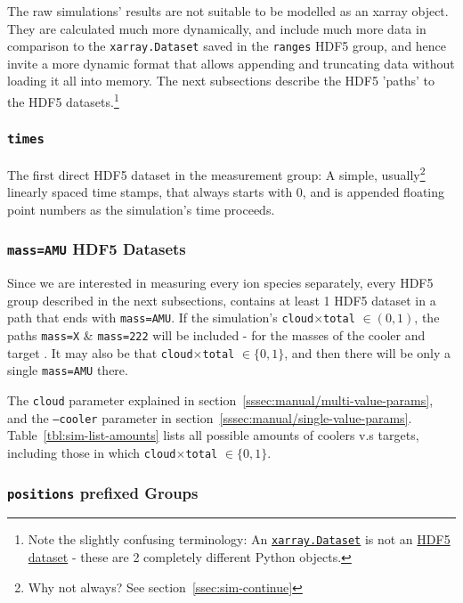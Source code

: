 The raw simulations' results are not suitable to be modelled as an xarray object. They are calculated much more dynamically, and include much more data in comparison to the \texttt{xarray.Dataset} saved in the \texttt{ranges} HDF5 group, and hence invite a more dynamic format that allows appending and truncating data without loading it all into memory. The next subsections describe the HDF5 'paths' to the HDF5 datasets.\footnote{Note the slightly confusing terminology: An \href{https://docs.xarray.dev/en/stable/generated/xarray.Dataset.html}{\texttt{xarray.Dataset}} is not an \href{https://docs.h5py.org/en/stable/high/dataset.html}{HDF5 dataset} - these are 2 completely different Python objects.}

\subsubsection{\texttt{times}}

The first direct HDF5 dataset in the measurement group: A simple, usually\footnote{Why not always? See section~\ref{ssec:sim-continue}} linearly spaced time stamps, that always starts with 0, and is appended floating point numbers as the simulation's time proceeds.

\subsubsection{\texttt{mass=AMU} HDF5 Datasets}

Since we are interested in measuring every ion species separately, every HDF5 group described in the next subsections, contains at least 1 HDF5 dataset in a path that ends with \texttt{mass=AMU}. If the simulation's \texttt{cloud}$\times$\texttt{total} $\in(0,1)$, the paths \texttt{mass=X} \& \texttt{mass=222} will be included - for the masses of the cooler and target . It may also be that \texttt{cloud}$\times$\texttt{total} $\in\{0,1\}$, and then there will be only a single \texttt{mass=AMU} there.

The \texttt{cloud} parameter explained in section~\ref{sssec:manual/multi-value-params}, and the \texttt{--cooler} parameter in section~\ref{sssec:manual/single-value-params}. Table~\ref{tbl:sim-list-amounts} lists all possible amounts of coolers v.s targets, including those in which \texttt{cloud}$\times$\texttt{total} $\in\{0,1\}$.

\subsubsection{\texttt{positions} prefixed Groups}

